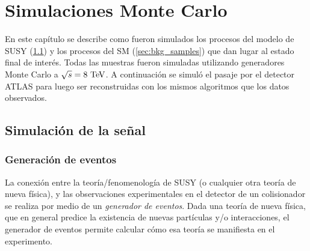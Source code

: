 \chapter{Simulaciones Monte Carlo}\label{cap:simulaciones}

En este capítulo se describe como fueron simulados los procesos del modelo de
SUSY (\cref{sec:sig_samples}) y los procesos del SM (\cref{sec:bkg_samples}) que
dan lugar al estado final de interés. Todas las muestras fueron simuladas
utilizando generadores Monte Carlo a $\sqrt{s}=8\tev$. A continuación se simuló
el pasaje por el detector ATLAS para luego ser reconstruidas con los mismos
algoritmos que los datos observados.






\section{Simulación de la se\~nal}\label{sec:sig_samples}

\subsection{Generación de eventos}

La conexión entre la teoría/fenomenología de SUSY (o cualquier otra teoría de
nueva física), y las observaciones experimentales en el detector de un
colisionador se realiza por medio de un \emph{generador de eventos}. Dada una
teoría de nueva física, que en general predice la existencia de nuevas
partículas y/o interacciones, el generador de eventos permite calcular cómo esa
teoría se manifiesta en el experimento\cite{Baer:2009tk}.

